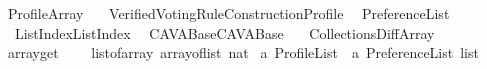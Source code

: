 %
\begin{isabellebody}%
%
%
\isadelimtheory
%
\endisadelimtheory
%
\isatagtheory
{}\isamarkupfalse%
\ Profile{\isacharunderscore}{\kern0pt}Array\isanewline
\ \ \ {\isachardoublequoteopen}Verified{\isacharunderscore}{\kern0pt}Voting{\isacharunderscore}{\kern0pt}Rule{\isacharunderscore}{\kern0pt}Construction{\isachardot}{\kern0pt}Profile{\isachardoublequoteclose}\isanewline
\ \ Preference{\isacharunderscore}{\kern0pt}List\ \isanewline
\ \ {\isachardoublequoteopen}List{\isacharminus}{\kern0pt}Index{\isachardot}{\kern0pt}List{\isacharunderscore}{\kern0pt}Index{\isachardoublequoteclose}\isanewline
\ \ CAVA{\isacharunderscore}{\kern0pt}Base{\isachardot}{\kern0pt}CAVA{\isacharunderscore}{\kern0pt}Base\ \isanewline
\ \ {\isachardoublequoteopen}Collections{\isachardot}{\kern0pt}Diff{\isacharunderscore}{\kern0pt}Array{\isachardoublequoteclose}\isanewline
{}%
\endisatagtheory
{\isafoldtheory}%
%
\isadelimtheory
\isanewline
%
\endisadelimtheory
\isanewline
{}\isamarkupfalse%
\ array{\isacharunderscore}{\kern0pt}get\ {\isacharparenleft}{\kern0pt}{\isachardoublequoteopen}{\isacharunderscore}{\kern0pt}{\isacharbrackleft}{\kern0pt}{\isacharbrackleft}{\kern0pt}{\isacharunderscore}{\kern0pt}{\isacharbrackright}{\kern0pt}{\isacharbrackright}{\kern0pt}{\isachardoublequoteclose}\ {\isacharbrackleft}{\kern0pt}{}{}{}{\isacharcomma}{\kern0pt}{}{\isacharbrackright}{\kern0pt}\ {}{}{}{}{\isacharparenright}{\kern0pt}\isanewline
\isanewline
{}\isamarkupfalse%
\ {\isachardoublequoteopen}list{\isacharunderscore}{\kern0pt}of{\isacharunderscore}{\kern0pt}array\ {\isacharparenleft}{\kern0pt}array{\isacharunderscore}{\kern0pt}of{\isacharunderscore}{\kern0pt}list\ {\isacharbrackleft}{\kern0pt}{}{\isacharcolon}{\kern0pt}{\isacharcolon}{\kern0pt}nat{\isacharcomma}{\kern0pt}{}{\isacharbrackright}{\kern0pt}{\isacharparenright}{\kern0pt}{\isachardoublequoteclose}\isanewline
\isanewline
{}\isamarkupfalse%
\ {\isacharprime}{\kern0pt}a\ Profile{\isacharunderscore}{\kern0pt}List\ {\isacharequal}{\kern0pt}\ {\isachardoublequoteopen}{\isacharparenleft}{\kern0pt}{\isacharprime}{\kern0pt}a\ Preference{\isacharunderscore}{\kern0pt}List{\isacharparenright}{\kern0pt}\ list{\isachardoublequoteclose}\isanewline
\isanewline
{}\isamarkupfalse%

\end{isabellebody}
